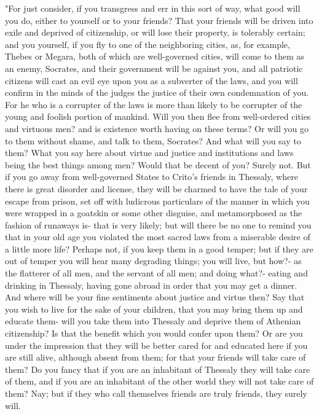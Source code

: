 "For just consider, if you transgress and err in this sort of way,
what good will you do, either to yourself or to your friends? That
your friends will be driven into exile and deprived of citizenship,
or will lose their property, is tolerably certain; and you yourself,
if you fly to one of the neighboring cities, as, for example, Thebes
or Megara, both of which are well-governed cities, will come to them
as an enemy, Socrates, and their government will be against you, and
all patriotic citizens will cast an evil eye upon you as a subverter
of the laws, and you will confirm in the minds of the judges the justice
of their own condemnation of you. For he who is a corrupter of the
laws is more than likely to be corrupter of the young and foolish
portion of mankind. Will you then flee from well-ordered cities and
virtuous men? and is existence worth having on these terms? Or will
you go to them without shame, and talk to them, Socrates? And what
will you say to them? What you say here about virtue and justice and
institutions and laws being the best things among men? Would that
be decent of you? Surely not. But if you go away from well-governed
States to Crito's friends in Thessaly, where there is great disorder
and license, they will be charmed to have the tale of your escape
from prison, set off with ludicrous particulars of the manner in which
you were wrapped in a goatskin or some other disguise, and metamorphosed
as the fashion of runaways is- that is very likely; but will there
be no one to remind you that in your old age you violated the most
sacred laws from a miserable desire of a little more life? Perhaps
not, if you keep them in a good temper; but if they are out of temper
you will hear many degrading things; you will live, but how?- as the
flatterer of all men, and the servant of all men; and doing what?-
eating and drinking in Thessaly, having gone abroad in order that
you may get a dinner. And where will be your fine sentiments about
justice and virtue then? Say that you wish to live for the sake of
your children, that you may bring them up and educate them- will you
take them into Thessaly and deprive them of Athenian citizenship?
Is that the benefit which you would confer upon them? Or are you under
the impression that they will be better cared for and educated here
if you are still alive, although absent from them; for that your friends
will take care of them? Do you fancy that if you are an inhabitant
of Thessaly they will take care of them, and if you are an inhabitant
of the other world they will not take care of them? Nay; but if they
who call themselves friends are truly friends, they surely will.

